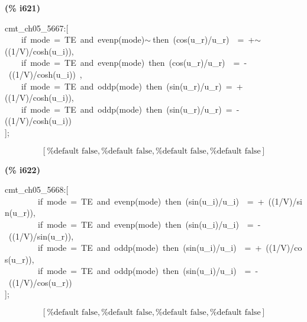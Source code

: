 \documentclass[fleqn]{article}
\begin{document}
\noindent
\begin{minipage}[t]{4.000000em}\color{red}\bfseries
(\% i621)	
\end{minipage}
\begin{minipage}[t]{\textwidth}\color{blue}
cmt\_ch05\_5667:[\\
\ \ \ \ if\ mode\ =\ TE\ and\ evenp(mode)\ensuremath{\sim\ }then\ (cos(u\_r)/u\_r)\ \ =\ +\ensuremath{\sim\ }((1/V)/cosh(u\_i)),\\
\ \ \ \ if\ mode\ =\ TE\ and\ evenp(mode)\ then\ (cos(u\_r)/u\_r)\ \ =\ -\ ((1/V)/cosh(u\_i))\ ,\ \ \ \\
\ \ \ \ if\ mode\ =\ TE\ and\ oddp(mode)\ then\ (sin(u\_r)/u\_r)\ =\ +((1/V)/cosh(u\_i)),\\
\ \ \ \ if\ mode\ =\ TE\ and\ oddp(mode)\ then\ (sin(u\_r)/u\_r)\ =\ -((1/V)/cosh(u\_i))\\
];
\end{minipage}
\[\displaystyle \tag{\% o621} 
\left[ \mbox{%
false}\operatorname{,}\mbox{%
false}\operatorname{,}\mbox{%
false}\operatorname{,}\mbox{%
false}\right] \mbox{}
\]


\noindent
\begin{minipage}[t]{4.000000em}\color{red}\bfseries
(\% i622)	
\end{minipage}
\begin{minipage}[t]{\textwidth}\color{blue}
cmt\_ch05\_5668:[\\
\ \ \ \ \ \ \ \ if\ mode\ =\ TE\ and\ evenp(mode)\ then\ (sin(u\_i)/u\_i)\ \ =\ +\ ((1/V)/sin(u\_r)),\\
\ \ \ \ \ \ \ \ if\ mode\ =\ TE\ and\ evenp(mode)\ then\ (sin(u\_i)/u\_i)\ \ =\ -\ ((1/V)/sin(u\_r)),\\
\ \ \ \ \ \ \ \ if\ mode\ =\ TE\ and\ oddp(mode)\ then\ (sin(u\_i)/u\_i)\ \ =\ +\ ((1/V)/cos(u\_r)),\\
\ \ \ \ \ \ \ \ if\ mode\ =\ TE\ and\ oddp(mode)\ then\ (sin(u\_i)/u\_i)\ \ =\ -\ ((1/V)/cos(u\_r))\\
];
\end{minipage}
\[\displaystyle \tag{\% o622} 
\left[ \mbox{%
false}\operatorname{,}\mbox{%
false}\operatorname{,}\mbox{%
false}\operatorname{,}\mbox{%
false}\right] \mbox{}
\]
\end{document}
